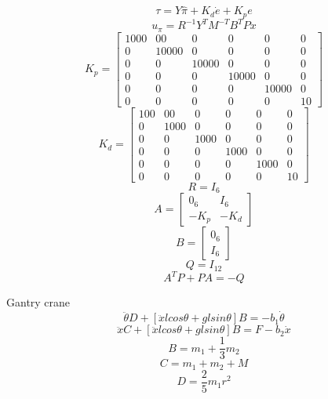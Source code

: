 \documentclass[a4paper]{article}
\begin{document}
\begin{equation}
\tau = Y \hat{\pi} + K_d\dot{e} + K_p e
\end{equation}
\begin{equation}
u_{\pi} = R^{-1} Y^T M^{-T} B^T P x
\end{equation}
\begin{equation}
K_p = 
\begin{bmatrix}
1000 & 00 & 0	& 0 & 0 & 0 \\
0 & 10000 & 0 & 0 & 0 & 0 \\
0 & 0 & 10000 & 0 & 0 & 0 \\
0 & 0 & 0 & 10000 & 0 & 0 \\
0 & 0 & 0 & 0 & 10000 & 0 \\
0 & 0 & 0 & 0 & 0 & 10
\end{bmatrix}
\end{equation}
\begin{equation}
K_d = 
\begin{bmatrix}
100 & 00 & 0	& 0 & 0 & 0 \\
0 & 1000 & 0 & 0 & 0 & 0 \\
0 & 0 & 1000 & 0 & 0 & 0 \\
0 & 0 & 0 & 1000 & 0 & 0 \\
0 & 0 & 0 & 0 & 1000 & 0 \\
0 & 0 & 0 & 0 & 0 & 10
\end{bmatrix}
\end{equation}
\begin{equation}
R = I_{6}
\end{equation}
\begin{equation}
A = 
\begin{bmatrix}
0_{6} & I_{6} \\
-K_p & -K_d 
\end{bmatrix}
\end{equation}
\begin{equation}
B = 
\begin{bmatrix}
0_{6} \\
I_{6}
\end{bmatrix}
\end{equation}
\begin{equation}
Q = I_{12}
\end{equation}
\begin{equation}
A^T P + P A = -Q
\end{equation}

Gantry crane
\begin{equation}
\ddot{\theta}D  + [\ddot{x}lcos\theta + glsin\theta] B = -b_1 \dot{\theta}
\end{equation}
\begin{equation}
\ddot{x}C  + [\ddot{x}lcos\theta + glsin\theta] B = F - b_2 \dot{x}
\end{equation}
\begin{equation}
B = m_1 + \frac{1}{3}m_2
\end{equation}
\begin{equation}
C = m_1 + m_2 + M
\end{equation}
\begin{equation}
D = \frac{2}{5}m_1r^2
\end{equation}
\end{document}

